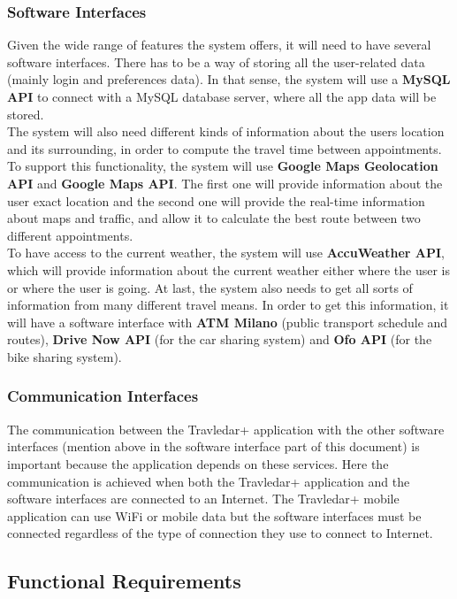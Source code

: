 \documentclass[12pt]{article}
\begin{document}
\subsubsection{Software Interfaces}
Given the wide range of features the system offers, it will need to have several software interfaces. There has to be a way of storing all the user-related data (mainly login and preferences data). In that sense, the system will use a \textbf{MySQL API} to connect with a MySQL database server, where all the app data will be stored.\\
The system will also need different kinds of information about the users location and its surrounding, in order to compute the travel time between appointments. To support this functionality, the system will use \textbf{Google Maps Geolocation API} and \textbf{Google Maps API}. The first one will provide information about the user exact location and the second one will provide the real-time information about maps and traffic, and allow it to calculate the best route between two different appointments.\\
To have access to the current weather, the system will use \textbf{AccuWeather API}, which will provide information about the current weather either where the user is or where the user is going.
At last, the system also needs to get all sorts of information from many different travel means. In order to get this information, it will have a software interface with \textbf{ATM Milano} (public transport schedule and routes), \textbf{Drive Now API} (for the car sharing system) and \textbf{Ofo API} (for the bike sharing system).



\subsubsection{Communication Interfaces}
The communication between the Travledar+ application with the other software interfaces (mention above in the software interface part of this document) is important because the application depends on these services. Here the communication is achieved when both the Travledar+ application and the software interfaces are connected to an Internet. The Travledar+ mobile application can use WiFi or mobile data but the software interfaces must be connected regardless of the type of connection they use to connect to Internet.



\subsection{Functional Requirements}
\end{document}
